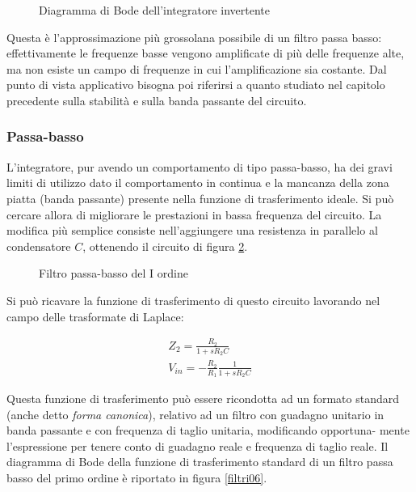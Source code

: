\documentclass[../main.tex]{subfiles}
\begin{document}
\begin{figure}
\begin{center}


\label{filtri04}
\caption{Diagramma di Bode dell’integratore invertente}	
\end{center}	
\end{figure}

Questa è l’approssimazione più grossolana possibile di un filtro passa basso: effettivamente le frequenze basse vengono amplificate di più delle frequenze alte, ma non esiste un campo di frequenze in cui l’amplificazione sia costante. Dal punto di vista applicativo bisogna poi riferirsi a quanto studiato nel capitolo precedente sulla stabilità e sulla banda passante del circuito.

\subsubsection{Passa-basso}

L’integratore, pur avendo un comportamento di tipo passa-basso, ha dei gravi limiti di utilizzo dato il comportamento in continua e la mancanza della zona piatta (banda passante) presente nella funzione di trasferimento ideale. 
Si può cercare allora di migliorare le prestazioni in bassa frequenza del circuito. La modifica più semplice consiste nell’aggiungere una resistenza in parallelo al condensatore $C$, ottenendo il circuito di figura \ref{filtri05}.

\begin{figure}
\begin{center}


\label{filtri05}
\caption{Filtro passa-basso del I ordine}	
\end{center}	
\end{figure}

Si può ricavare la funzione di trasferimento di questo circuito lavorando nel campo delle trasformate di Laplace:

\begin{equation}
\begin{split}
	Z_2 = \frac{R_2}{1 + sR_2C} \\
	V_{in} = -  \frac{R_2}{R_1} \frac{1}{1 + sR_2C}
\end{split}
\end{equation}


Questa funzione di trasferimento può essere ricondotta ad un formato standard (anche detto \textit{forma canonica}), relativo ad un filtro con guadagno unitario in banda passante e con frequenza di taglio unitaria, modificando opportuna- mente l’espressione per tenere conto di guadagno reale e frequenza di taglio reale. 
Il diagramma di Bode della funzione di trasferimento standard di un filtro passa basso del primo ordine è riportato in figura \ref{filtri06}.
\end{document}
